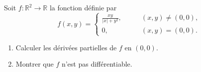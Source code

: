\begin{exercice}\label{exodevoir2-0005}
 
Soit $f:\mathbb{R}^2\to\mathbb{R}$ la fonction définie par 
\[
f(x,y)=\left\{
\begin{array}{ll}
  \frac{xy}{|x|+y^2},\qquad & (x,y)\neq (0,0),\\
  0, &(x,y)=(0,0). 
\end{array}\right.
\]
\begin{enumerate}
\item Calculer les dérivées partielles de $f$ en $(0,0)$. 
\item Montrer que $f$ n'est pas différentiable. 
\end{enumerate}

\end{exercice}
